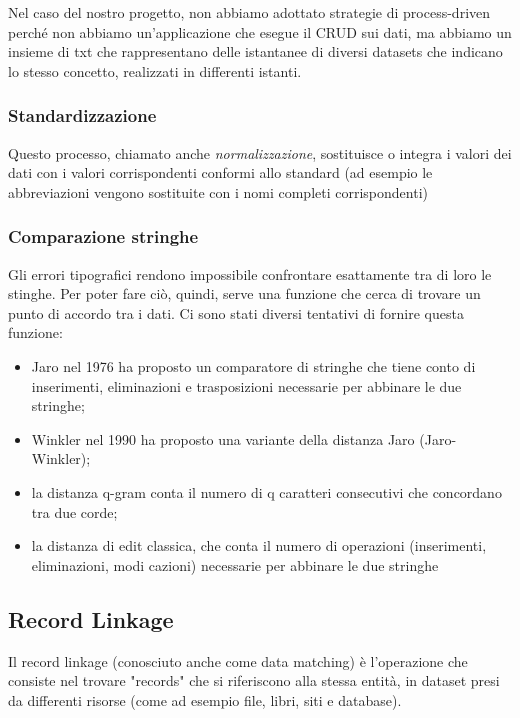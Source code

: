 \documentclass[a4paper,12pt]{article}
\begin{document}
\noindent Nel caso del nostro progetto, non abbiamo adottato strategie di process-driven perché non abbiamo un'applicazione che esegue il CRUD sui dati, ma abbiamo un insieme di txt che rappresentano delle istantanee di diversi datasets che indicano lo stesso concetto, realizzati in differenti istanti.

\subsubsection{Standardizzazione}

Questo processo, chiamato anche \textit{normalizzazione}, sostituisce o integra i valori dei dati con i valori corrispondenti conformi allo standard (ad esempio le abbreviazioni vengono sostituite con i nomi completi corrispondenti)

\subsubsection{Comparazione stringhe}

Gli errori tipografici rendono impossibile confrontare esattamente tra di loro le stinghe.  Per poter fare ciò, quindi, serve una funzione che cerca di trovare un punto di accordo tra i dati. Ci sono stati diversi tentativi di fornire questa funzione:

\begin{itemize}
\item Jaro \cite{census/jaro76} nel 1976 ha proposto un comparatore di stringhe che tiene conto di inserimenti, eliminazioni e trasposizioni necessarie per abbinare le due stringhe;
\item Winkler \cite{winkler90} nel 1990 ha proposto una variante della distanza Jaro (Jaro-Winkler);
\item la distanza q-gram conta il numero di q caratteri consecutivi che concordano tra due corde;
\item la distanza di edit classica, che conta il numero di operazioni (inserimenti, eliminazioni, modi cazioni) necessarie per abbinare le due stringhe
\end{itemize}

\subsection{Record Linkage}

Il record linkage (conosciuto anche come data matching) è l'operazione che consiste nel trovare "records" che si riferiscono alla stessa entità, in dataset presi da differenti risorse (come ad esempio file, libri, siti e database). \\
\end{document}
